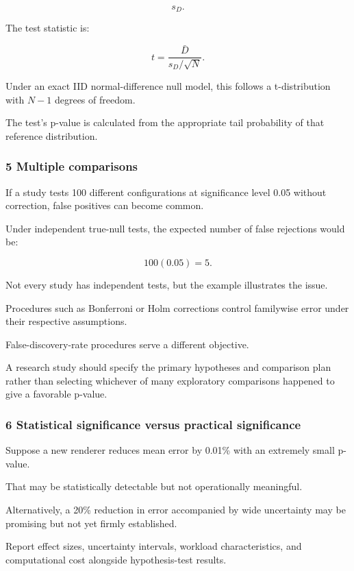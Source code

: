 \[
 s_D.
\]

The test statistic is:

\[
 \boxed{ t= \frac{\bar D}{s_D/\sqrt N} }.
\]

Under an exact IID normal-difference null model, this follows a t-distribution with \(N-1\) degrees of freedom.

The test's p-value is calculated from the appropriate tail probability of that reference distribution.

\subsubsection{5 Multiple comparisons}\label{02-foundations-ii-ch030-multiple-comparisons}

If a study tests 100 different configurations at significance level 0.05 without correction, false positives can become common.

Under independent true-null tests, the expected number of false rejections would be:

\[
 100(0.05)=5.
\]

Not every study has independent tests, but the example illustrates the issue.

Procedures such as Bonferroni or Holm corrections control familywise error under their respective assumptions.

False-discovery-rate procedures serve a different objective.

A research study should specify the primary hypotheses and comparison plan rather than selecting whichever of many exploratory comparisons happened to give a favorable p-value.

\subsubsection{6 Statistical significance versus practical significance}\label{02-foundations-ii-ch030-statistical-significance-versus-practical-significance}

Suppose a new renderer reduces mean error by 0.01\% with an extremely small p-value.

That may be statistically detectable but not operationally meaningful.

Alternatively, a 20\% reduction in error accompanied by wide uncertainty may be promising but not yet firmly established.

Report effect sizes, uncertainty intervals, workload characteristics, and computational cost alongside hypothesis-test results.

